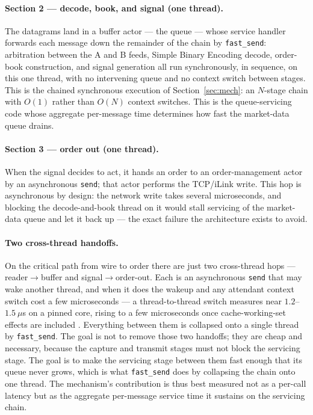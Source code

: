 \documentclass[11pt]{article}
\newcommand{\fs}{\texttt{fast\_send}}
\newcommand{\snd}{\texttt{send}}
\begin{document}
\paragraph{Section 2 --- decode, book, and signal (one thread).} The datagrams
land in a buffer actor --- the queue --- whose service handler forwards each
message down the remainder of the chain by \fs{}: arbitration between the A and B
feeds, Simple Binary Encoding decode, order-book construction, and signal
generation all run synchronously, in sequence, on this one thread, with no
intervening queue and no context switch between stages. This is the chained
synchronous execution of Section~\ref{sec:mech}: an $N$-stage chain with
$O(1)$ rather than $O(N)$ context switches. This is the queue-servicing code
whose aggregate per-message time determines how fast the market-data queue
drains.

\paragraph{Section 3 --- order out (one thread).} When the signal decides to
act, it hands an order to an order-management actor by an asynchronous \snd{};
that actor performs the TCP/iLink write. This hop is asynchronous by design: the
network write takes several microseconds, and blocking the decode-and-book thread
on it would stall servicing of the market-data queue and let it back up --- the
exact failure the architecture exists to avoid.

\paragraph{Two cross-thread handoffs.} On the critical path from wire to order
there are just two cross-thread hops --- reader$\to$buffer and
signal$\to$order-out. Each is an asynchronous \snd{} that may wake another thread,
and when it does the wakeup and any attendant context switch cost a few
microseconds --- a thread-to-thread switch measures near $1.2$--$1.5~\mu$s on a
pinned core, rising to a few microseconds once cache-working-set effects are
included \cite{li2007,bendersky2018,mcvoy1996}. Everything between them is
collapsed onto a single thread by
\fs{}. The goal is not to remove those two handoffs; they are cheap and
necessary, because the capture and transmit stages must not block the servicing
stage. The goal is to make the servicing stage between them fast enough that its
queue never grows, which is what \fs{} does by collapsing the chain onto one
thread. The mechanism's contribution is thus best measured not as a per-call
latency but as the aggregate per-message service time it sustains on the
servicing chain.
\end{document}
